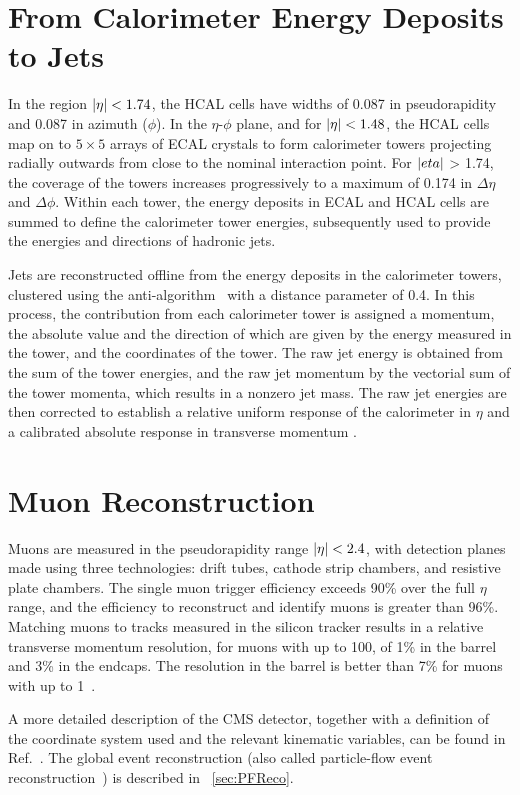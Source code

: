  \section{From Calorimeter Energy Deposits to Jets}\label{sec:CMSDetectorJets}

In the region $\lvert \eta \rvert < 1.74$, the HCAL cells have widths of 0.087 in pseudorapidity and 0.087 in azimuth ($\phi$). In the $\eta$-$\phi$ plane, and for $\lvert \eta \rvert < 1.48$, the HCAL cells map on to $5 \times 5$ arrays of ECAL crystals to form calorimeter towers projecting radially outwards from close to the nominal interaction point. For $\lvert  eta  \rvert$ > 1.74, the coverage of the towers increases progressively to a maximum of 0.174 in $\Delta \eta$ and $\Delta \phi$. Within each tower, the energy deposits in ECAL and HCAL cells are summed to define the calorimeter tower energies, subsequently used to provide the energies and directions of hadronic jets.

Jets are reconstructed offline from the energy deposits in the calorimeter towers, clustered using the anti-\kt algorithm~\cite{Cacciari:2008gp, Cacciari:2011ma} with a distance parameter of 0.4. In this process, the contribution from each calorimeter tower is assigned a momentum, the absolute value and the direction of which are given by the energy measured in the tower, and the coordinates of the tower. The raw jet energy is obtained from the sum of the tower energies, and the raw jet momentum by the vectorial sum of the tower momenta, which results in a nonzero jet mass. The raw jet energies are then corrected to establish a relative uniform response of the calorimeter in $\eta$ and a calibrated absolute response in transverse momentum \pt. 


 \section{Muon Reconstruction}\label{sec:CMSDetectorMuons}


Muons are measured in the pseudorapidity range $\lvert \eta \rvert < 2.4$, with detection planes made using three technologies: drift tubes, cathode strip chambers, and resistive plate chambers. The single muon trigger efficiency exceeds 90\% over the full $\eta$ range, and the efficiency to reconstruct and identify muons is greater than 96\%. Matching muons to tracks measured in the silicon tracker results in a relative transverse momentum resolution, for muons with \pt up to 100\GeV, of 1\% in the barrel and 3\% in the endcaps. The \pt resolution in the barrel is better than 7\% for muons with \pt up to 1\TeV~\cite{Sirunyan:2018}. 


A more detailed description of the CMS detector, together with a definition of the coordinate system used and the relevant kinematic variables, can be found in Ref.~\cite{Chatrchyan:2008zzk}.  The global event reconstruction (also called particle-flow event reconstruction~\cite{CMS-PRF-14-001}) is described in ~\ref{sec:PFReco}.


